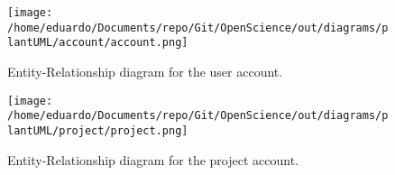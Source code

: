 \documentclass{article}
\begin{document}
\vspace{1cm}

\begin{figure}[H]
    \centering
    \texttt{[image: /home/eduardo/Documents/repo/Git/OpenScience/out/diagrams/plantUML/account/account.png]}  %
    \caption{Entity-Relationship diagram for the user account.}
    \label{fig:er-user-account-diagram}
\end{figure}


\vspace{1cm}

\begin{figure}[H]
    \centering
    \texttt{[image: /home/eduardo/Documents/repo/Git/OpenScience/out/diagrams/plantUML/project/project.png]}  %
    \caption{Entity-Relationship diagram for the project account.}
    \label{fig:er-project-account-diagram}
\end{figure}
\end{document}

